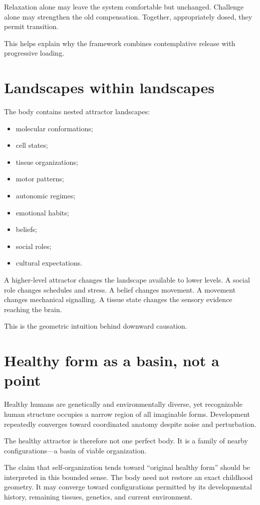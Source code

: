 Relaxation alone may leave the system comfortable but unchanged. Challenge alone may strengthen the old compensation. Together, appropriately dosed, they permit transition.

This helps explain why the framework combines contemplative release with progressive loading.

\section{Landscapes within landscapes}

The body contains nested attractor landscapes:

\begin{itemize}
\tightlist
\item
  molecular conformations;
\item
  cell states;
\item
  tissue organizations;
\item
  motor patterns;
\item
  autonomic regimes;
\item
  emotional habits;
\item
  beliefs;
\item
  social roles;
\item
  cultural expectations.
\end{itemize}

A higher-level attractor changes the landscape available to lower levels. A social role changes schedules and stress. A belief changes movement. A movement changes mechanical signalling. A tissue state changes the sensory evidence reaching the brain.

This is the geometric intuition behind downward causation.

\section{Healthy form as a basin, not a point}

Healthy humans are genetically and environmentally diverse, yet recognizable human structure occupies a narrow region of all imaginable forms. Development repeatedly converges toward coordinated anatomy despite noise and perturbation.

The healthy attractor is therefore not one perfect body. It is a family of nearby configurations---a basin of viable organization.

The claim that self-organization tends toward ``original healthy form'' should be interpreted in this bounded sense. The body need not restore an exact childhood geometry. It may converge toward configurations permitted by its developmental history, remaining tissues, genetics, and current environment.

